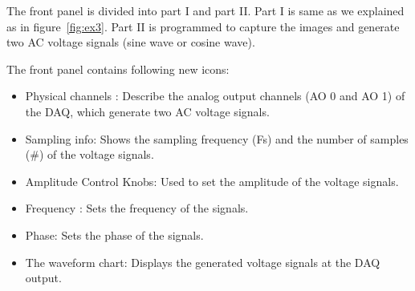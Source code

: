 \documentclass[journal=jacsat,manuscript=article]{achemso}
\begin{document}
The front panel is divided into part I and part II. Part I is same as we explained as in figure~\ref{fig:ex3}. Part II is programmed to capture the images and generate two AC voltage signals (sine wave or cosine wave). 

The front panel contains following new icons:
\begin{itemize}
	\item Physical channels : Describe the analog output channels (AO 0 and AO 1) of the DAQ, which generate two AC voltage signals.
	\item Sampling info: Shows the sampling frequency (Fs) and the number of samples (\#) of the voltage signals.
	\item Amplitude Control Knobs: Used to set the amplitude of the voltage signals.
	\item Frequency : Sets the frequency of the signals.
	\item Phase: Sets the phase of the signals.
	\item The waveform chart: Displays the generated voltage signals at the DAQ output.	
\end{itemize}
\end{document}
